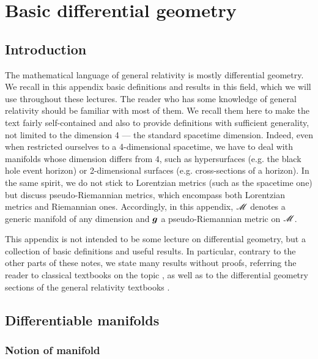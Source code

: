 \chapter{Basic differential geometry} \label{s:bas}

\minitoc

\section{Introduction}

The mathematical language of general relativity is mostly differential geometry.
We recall in this appendix basic definitions and results in this field, which we will use
throughout these lectures. The reader who has some knowledge of general relativity should be familiar with most of them. We recall them here to make the text fairly self-contained and also to provide definitions with sufficient generality, not limited to the dimension 4 --- the standard spacetime dimension. Indeed, even when restricted ourselves to
a 4-dimensional spacetime, we have to deal with manifolds whose dimension differs from 4,
such as hypersurfaces (e.g. the black hole event horizon) or 2-dimensional surfaces
(e.g.  cross-sections of a horizon).
In the same spirit, we do not stick to Lorentzian metrics
(such as the spacetime one) but discuss pseudo-Riemannian metrics, which
encompass both Lorentzian metrics and Riemannian ones.
Accordingly, in this appendix, $\mathscr{M}$ denotes a generic manifold of any dimension
and $\bm{g}$ a pseudo-Riemannian metric on $\mathscr{M}$.

This appendix is not intended to be some lecture on differential geometry, but
a collection of basic definitions and useful results. In particular,
contrary to the other parts of these notes, we state many results without proofs,
referring the reader to classical textbooks on the topic
\cite{Lafon15,Lee13,Lee18,ONeil83,Berge03,ChoquDD77,Eschr11}, as well as
to the differential geometry sections of the general relativity textbooks
\cite{Choqu09,Strau13,Wald84}.


\section{Differentiable manifolds} \label{s:bas:manif}

\subsection{Notion of manifold} \label{s:bas:def_manif}

